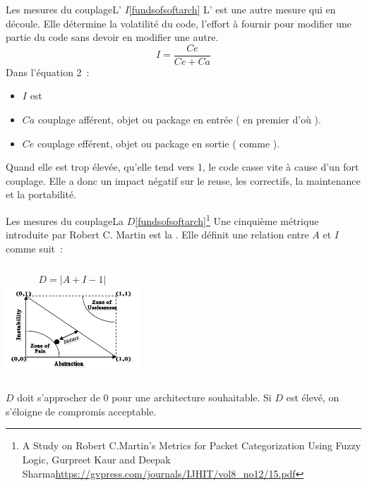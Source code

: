 \documentclass{beamer}
\begin{document}
    \begin{frame}{Les mesures du couplage}{L' $I$\cref{fundsofsoftarch}}
        L' est une autre mesure qui en découle.
        Elle détermine la volatilité du code, l'effort à fournir pour modifier une partie du code sans devoir en modifier une autre.
        \begin{equation}
            I = \frac{Ce}{Ce + Ca}
        \end{equation}
        Dans l'équation 2~:
        \begin{itemize}
            \item $I$ est 
            \item $Ca$ couplage afférent, objet ou package en entrée ( en premier d'où ).
            \item $Ce$ couplage efférent, objet ou package en sortie ( comme ).
        \end{itemize}
        \bigbreak
        Quand elle est trop élevée, qu'elle tend vers 1, le code casse vite à cause d'un fort couplage.
        Elle a donc un impact négatif sur le reuse, les correctifs, la maintenance et la portabilité.
    \end{frame}

    \begin{frame}{Les mesures du couplage}{La $D$\cref{fundsofsoftarch}\footnotestep\footnote{A Study on Robert C.Martin’s Metrics for Packet Categorization
    Using Fuzzy Logic, Gurpreet Kaur and Deepak Sharma\url{https://gvpress.com/journals/IJHIT/vol8_no12/15.pdf}}}
        Une cinquième métrique introduite par Robert C. Martin est la .
        \bigbreak
        Elle définit une relation entre $A$ et $I$ comme suit~:
        \begin{columns}
            \begin{equation}
                D = |A + I - 1|
            \end{equation}
            \centering
            \includegraphics[width=5cm]{image/distance-from-main-sequence}
        \end{columns}
        \flushleft
        $D$ doit s'approcher de 0 pour une architecture souhaitable.
        Si $D$ est élevé, on s'éloigne de compromis acceptable.
    \end{frame}
\end{document}

